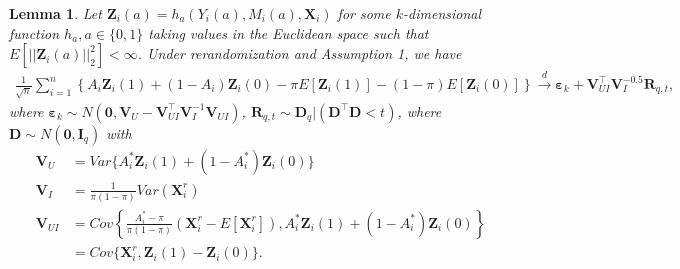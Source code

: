 \documentclass[12pt]{article}
\newtheorem{lemma}{Lemma}
\newcommand{\bX}{\boldsymbol{X}}
\newcommand{\bZ}{\boldsymbol{Z}}
\newcommand{\bR}{\boldsymbol{R}}
\newcommand{\bD}{\boldsymbol{D}}
\newcommand{\bzero}{\boldsymbol{0}}
\newcommand{\bfV}{\mathbf{V}}
\begin{document}
\begin{lemma}\label{lemma2}
    Let $\bZ_i(a) = h_a(Y_i(a), M_i(a), \bX_i)$  for some $k$-dimensional function $h_a, a \in \{0,1\}$ taking values in the Euclidean space such that $E[||\bZ_i(a)||_2^2] < \infty$. Under rerandomization and Assumption 1, we have
    \begin{align*}
        \frac{1}{\sqrt{n}}\sum_{i=1}^n \left\{A_i\bZ_i(1) + (1-A_i)\bZ_i(0) - \pi E[\bZ_i(1)] - (1-\pi) E[\bZ_i(0)]\right\} \xrightarrow{d}  \boldsymbol{\varepsilon}_k + \bfV_{UI}^\top \bfV_I^{-0.5} \bR_{q,t},
    \end{align*}
    where $\boldsymbol{\varepsilon}_k \sim N(\bzero,\bfV_U -  \bfV_{UI}^\top \bfV_I^{-1}\bfV_{UI})$, $\bR_{q,t} \sim  \bD_q|( \bD^\top  \bD < t)$,  where $\bD \sim N(\bzero, \mathbf{I}_q)$ with
    \begin{align*}
        \bfV_U &= Var\{A_i^*\bZ_i(1) + (1-A_i^*)\bZ_i(0)\} \\
        \bfV_I &= \frac{1}{\pi(1-\pi)}Var(\bX_i^r) \\
        \bfV_{UI} &= Cov\left\{\frac{A_i^*-\pi}{\pi(1-\pi)}(\bX_i^r-E[\bX_i^r]), A_i^*\bZ_i(1) + (1-A_i^*)\bZ_i(0)\right\}\\
        &= Cov\{\bX_i^r, \bZ_i(1)-\bZ_i(0)\}.
    \end{align*}
\end{lemma}
\end{document}
